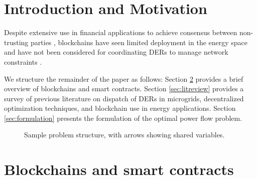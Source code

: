 \section{Introduction and Motivation}

Despite extensive use in financial applications to achieve consensus between non-trusting parties \cite{Killeen2015}, blockchains have seen limited deployment in the energy space \cite{DeutscheEnergie-AgenturGmbHdena2016} and have not been considered for coordinating DERs to manage network constraints \cite{Bonneau2015}.

We structure the remainder of the paper as follows: Section \ref{sec:blockchain} provides a brief overview of blockchains and smart contracts. Section \ref{sec:litreview} provides a survey of previous literature on dispatch of DERs in microgrids, decentralized optimization techniques, and blockchain use in energy applications. Section \ref{sec:formulation} presents the formulation of the optimal power flow problem.


\begin{figure}[h]
\caption{Sample problem structure, with arrows showing shared variables.}
\label{fig:nodefigure}
\end{figure}

\section{Blockchains and smart contracts}
\label{sec:blockchain}

